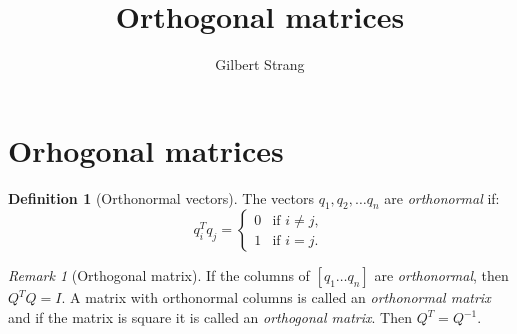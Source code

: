 \documentclass{tufte-handout}
\author{Gilbert Strang}
\title{Orthogonal matrices}
\theoremstyle{definition} \newtheorem{definition}{Definition}
\theoremstyle{remark} \newtheorem{remark}{Remark}
\begin{document}
\maketitle

\section{Orhogonal matrices}
\begin{definition}[Orthonormal vectors]
  The vectors $q_1, q_2, \ldots q_n$ are \emph{orthonormal} if:
  \begin{equation*}
    q_i^Tq_j =
    \begin{cases}
      0 & \text{if } i \ne j,\\
      1 & \text{if } i = j.
    \end{cases}
  \end{equation*}
\end{definition}

\begin{remark}[Orthogonal matrix]
  If the columns of $[q_1  \ldots q_n]$ are \emph{orthonormal},
  then $Q^TQ = I$. A matrix with orthonormal columns is called
  an \emph{orthonormal matrix} and if the matrix is square it is called an
  \emph{orthogonal matrix}. Then $Q^T = Q^{-1}$.
\end{remark}
\end{document}
